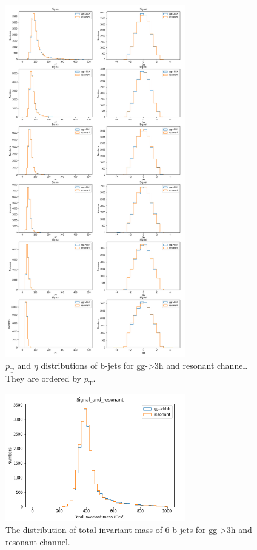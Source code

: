 \documentclass[12pt]{article}
\begin{document}
	\begin{figure}[htpb]
		\centering
		\includegraphics[width=0.7\textwidth]{Signal_PT_Eta_order_by_PT.png}
		\caption{$p_\text{T}$ and $\eta$ distributions of b-jets for gg->3h and resonant channel. They are ordered by $p_\text{T}$.}
		\label{fig:signal_resonant_pt_eta_distribution_of_b_jets}
	\end{figure}
	\begin{figure}[htpb]
		\centering
		\includegraphics[width=0.7\textwidth]{Signal_and_resonant_total_invariant_mass.png}
		\caption{The distribution of total invariant mass of 6 b-jets for gg->3h and resonant channel.}
		\label{fig:signal_resonant_total_invariant_mass_of_b_jets}
	\end{figure}
\end{document}

